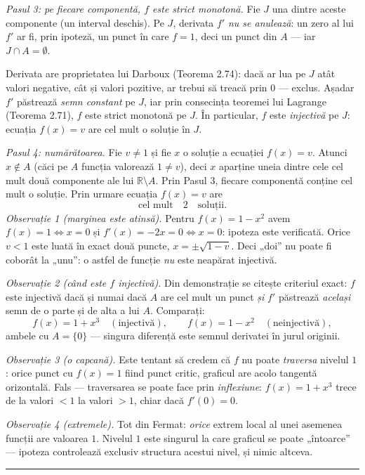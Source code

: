 \emph{Pasul 3: pe fiecare componentă, $f$ este strict monotonă.} Fie $J$ una dintre aceste componente (un interval deschis). Pe $J$, derivata $f'$ \emph{nu se anulează}: un zero al lui $f'$ ar fi, prin ipoteză, un punct în care $f=1$, deci un punct din $A$ --- iar $J\cap A=\emptyset$.

Derivata are proprietatea lui Darboux (Teorema 2.74): dacă ar lua pe $J$ atât valori negative, cât și valori pozitive, ar trebui să treacă prin $0$ --- exclus. Așadar $f'$ păstrează \emph{semn constant} pe $J$, iar prin consecința teoremei lui Lagrange (Teorema 2.71), $f$ este strict monotonă pe $J$. În particular, $f$ este \emph{injectivă} pe $J$: ecuația $f(x)=v$ are cel mult o soluție în $J$.

\emph{Pasul 4: numărătoarea.} Fie $v\neq1$ și fie $x$ o soluție a ecuației $f(x)=v$. Atunci $x\notin A$ (căci pe $A$ funcția valorează $1\neq v$), deci $x$ aparține uneia dintre cele cel mult două componente ale lui $\mathbb{R}\setminus A$. Prin Pasul 3, fiecare componentă conține cel mult o soluție. Prin urmare ecuația $f(x)=v$ are
\[ \text{cel mult}\quad 2\quad\text{soluții}. \]
\emph{Observație 1 (marginea este atinsă).} Pentru $f(x)=1-x^{2}$ avem $f(x)=1\iff x=0$ și $f'(x)=-2x=0\iff x=0$: ipoteza este verificată. Orice $v<1$ este luată în exact două puncte, $x=\pm\sqrt{1-v}$. Deci „doi'' nu poate fi coborât la „unu'': o astfel de funcție \emph{nu} este neapărat injectivă.

\emph{Observație 2 (când este $f$ injectivă).} Din demonstrație se citește criteriul exact: $f$ este injectivă dacă și numai dacă $A$ are cel mult un punct \emph{și} $f'$ păstrează \emph{același} semn de o parte și de alta a lui $A$. Comparați:
\[ f(x)=1+x^{3}\quad(\text{injectivă}),\qquad f(x)=1-x^{2}\quad(\text{neinjectivă}), \]
ambele cu $A=\{0\}$ --- singura diferență este semnul derivatei în jurul originii.

\emph{Observație 3 (o capcană).} Este tentant să credem că $f$ nu poate \emph{traversa} nivelul $1$: orice punct cu $f(x)=1$ fiind punct critic, graficul are acolo tangentă orizontală. Fals --- traversarea se poate face prin \emph{inflexiune}: $f(x)=1+x^{3}$ trece de la valori $<1$ la valori $>1$, chiar dacă $f'(0)=0$.

\emph{Observație 4 (extremele).} Tot din Fermat: \emph{orice} extrem local al unei asemenea funcții are valoarea $1$. Nivelul $1$ este singurul la care graficul se poate „întoarce'' --- ipoteza controlează exclusiv structura acestui nivel, și nimic altceva.
\vspace{1mm}\hrule

